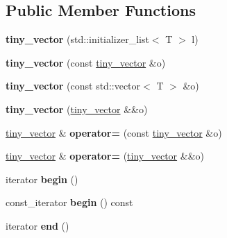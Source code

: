 \subsection*{Public Member Functions}
\begin{DoxyCompactItemize}
\item 
\mbox{\label{classtiny__vector_a681497534b9d70e0192d2855eefe18f5}} 
{\bfseries tiny\+\_\+vector} (std\+::initializer\+\_\+list$<$ T $>$ l)
\item 
\mbox{\label{classtiny__vector_ad5b3aaa0208c808fa051cc0b3b975457}} 
{\bfseries tiny\+\_\+vector} (const \hyperlink{classtiny__vector}{tiny\+\_\+vector} \&o)
\item 
\mbox{\label{classtiny__vector_ae285ef95d7b6aba59ac604845a2f2256}} 
{\bfseries tiny\+\_\+vector} (const std\+::vector$<$ T $>$ \&o)
\item 
\mbox{\label{classtiny__vector_ae018b542370ffe13103d2746c235fe61}} 
{\bfseries tiny\+\_\+vector} (\hyperlink{classtiny__vector}{tiny\+\_\+vector} \&\&o)
\item 
\mbox{\label{classtiny__vector_aa4f5f9d2ff0308197288bb12f95c531a}} 
\hyperlink{classtiny__vector}{tiny\+\_\+vector} \& {\bfseries operator=} (const \hyperlink{classtiny__vector}{tiny\+\_\+vector} \&o)
\item 
\mbox{\label{classtiny__vector_a27af57d5f051615e38b002a095e959c8}} 
\hyperlink{classtiny__vector}{tiny\+\_\+vector} \& {\bfseries operator=} (\hyperlink{classtiny__vector}{tiny\+\_\+vector} \&\&o)
\item 
\mbox{\label{classtiny__vector_a0e5df1d8c3a671caf31d218663bf4b92}} 
iterator {\bfseries begin} ()
\item 
\mbox{\label{classtiny__vector_aa832fc5ce5181ddd4a91d6021b521042}} 
const\+\_\+iterator {\bfseries begin} () const
\item 
\mbox{\label{classtiny__vector_a3a8687fc4dcdb69121be8e32e6755ebc}} 
iterator {\bfseries end} ()
\item 

\end{DoxyCompactItemize}
